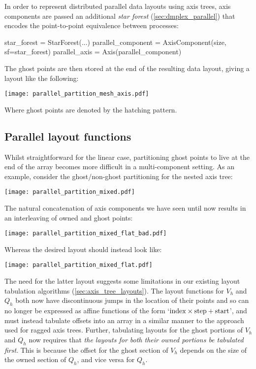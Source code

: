 \documentclass[thesis]{subfiles}
\begin{document}
In order to represent distributed parallel data layouts using axis trees, axis components are passed an additional \emph{star forest} (\cref{sec:dmplex_parallel}) that encodes the point-to-point equivalence between processes:
\begin{pyinline}
  star_forest = StarForest(...)
  parallel_component = AxisComponent(size, sf=star_forest)
  parallel_axis = Axis(parallel_component)
\end{pyinline}
The ghost points are then stored at the end of the resulting data layout, giving a layout like the following:
\begin{center}
  \texttt{[image: parallel\_partition\_mesh\_axis.pdf]}
\end{center}
Where ghost points are denoted by the hatching pattern.

\subsection{Parallel layout functions}

Whilst straightforward for the linear case, partitioning ghost points to live at the end of the array becomes more difficult in a multi-component setting.
As an example, consider the ghost/non-ghost partitioning for the nested axis tree:
\begin{center}
  \texttt{[image: parallel\_partition\_mixed.pdf]}
\end{center}
The natural concatenation of axis components we have seen until now results in an interleaving of owned and ghost points:
\begin{center}
  \texttt{[image: parallel\_partition\_mixed\_flat\_bad.pdf]}
\end{center}
Whereas the desired layout should instead look like:
\begin{center}
  \texttt{[image: parallel\_partition\_mixed\_flat.pdf]}
\end{center}

The need for the latter layout suggests some limitations in our existing layout tabulation algorithms (\cref{sec:axis_tree_layouts}).
The layout functions for $V_h$ and $Q_h$ both now have discontinuous jumps in the location of their points and so can no longer be expressed as affine functions of the form `$\textnormal{index} \times \textnormal{step} + \textnormal{start}$', and must instead tabulate offsets into an array in a similar manner to the approach used for ragged axis trees.
Further, tabulating layouts for the ghost portions of $V_h$ and $Q_h$ now requires that \emph{the layouts for both their owned portions be tabulated first}.
This is because the offset for the ghost section of $V_h$ depends on the size of the owned section of $Q_h$, and vice versa for $Q_h$.
\end{document}
